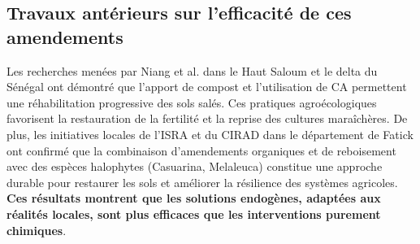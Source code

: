 \subsection{Travaux antérieurs sur l'efficacité de ces amendements}
Les recherches menées par Niang et al. \cite{niang_degradation_2017} dans le Haut Saloum et le delta du Sénégal ont démontré que l’apport de compost et l’utilisation de CA permettent une réhabilitation progressive des sols salés. Ces pratiques agroécologiques favorisent la restauration de la fertilité et la reprise des cultures maraîchères. De plus, les initiatives locales de l’ISRA et du CIRAD dans le département de Fatick ont confirmé que la combinaison d’amendements organiques et de reboisement avec des espèces halophytes (Casuarina, Melaleuca) constitue une approche durable pour restaurer les sols et améliorer la résilience des systèmes agricoles. \textbf{Ces résultats montrent que les solutions endogènes, adaptées aux réalités locales, sont plus efficaces que les interventions purement chimiques}.


